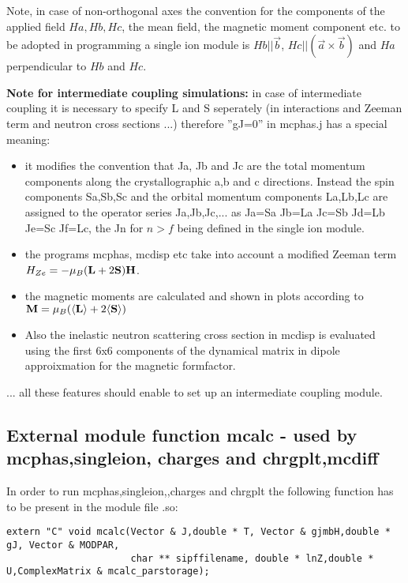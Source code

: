 Note, in case of non-orthogonal axes the convention for the components
of the applied field $Ha, Hb,Hc$, the mean field, the magnetic moment 
component etc. to be adopted in programming a single ion module is
 $Hb||\vec b$, $Hc||(\vec a \times \vec b)$ and $Ha$ perpendicular to $Hb$ and $Hc$.


{\bf Note for intermediate coupling simulations:} in case of intermediate coupling
it is necessary to specify
L and S seperately (in interactions and Zeeman term and neutron cross sections ...)
therefore  ''gJ=0'' in {\prg mcphas.j} has a special meaning:
\begin{itemize}
\item  it modifies
the convention that Ja, Jb and Jc are the total momentum components along the
crystallographic a,b and c directions. Instead
the spin components Sa,Sb,Sc and the orbital momentum components La,Lb,Lc are
assigned to the operator series Ja,Jb,Jc,... as  Ja=Sa Jb=La Jc=Sb Jd=Lb Je=Sc 
Jf=Lc, the Jn for $n>f$ being defined in the single ion module. 
\item the programs {\prg mcphas, mcdisp etc} take into account
 a modified Zeeman term $H_{Ze}=-\mu_B(\mathbf L+2\mathbf S)\mathbf H$.
\item the magnetic moments are calculated and shown in plots according 
to $\mathbf M=\mu_B(\langle \mathbf L\rangle+2\langle \mathbf S\rangle)$
\item Also the inelastic neutron scattering cross section in {\prg mcdisp} is evaluated using the %
first
6x6 components of the dynamical matrix  in dipole approixmation for the magnetic formfactor.
\end{itemize}
... all these features should enable to set up an intermediate coupling module.


\subsection{External module function {\prg mcalc} - used by {\prg mcphas},{\prg singleion},{\prg %
charges} and {\prg chrgplt},{\prg mcdiff} }

In order to run {\prg mcphas},{\prg singleion},,{\prg charges} and {\prg %
chrgplt} the following function has to be 
present in the module file {\prg *.so}:

\begin{verbatim}
extern "C" void mcalc(Vector & J,double * T, Vector & gjmbH,double * gJ, Vector & MODPAR,
                      char ** sipffilename, double * lnZ,double * U,ComplexMatrix & mcalc_parstorage);
\end{verbatim}

